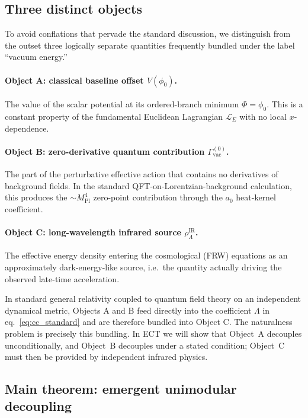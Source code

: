 \subsection{Three distinct objects}
\label{subsec:three_objects}

To avoid conflations that pervade the standard discussion, we
distinguish from the outset three logically separate quantities
frequently bundled under the label ``vacuum energy.''
\paragraph{Object A: classical baseline offset $V(\phi_0)$.}
The value of the scalar potential at its ordered-branch minimum
$\Phi = \phi_0$. This is a constant property of the fundamental
Euclidean Lagrangian $\mathcal{L}_E$ with no local $x$-dependence.

\paragraph{Object B: zero-derivative quantum contribution
$\Gamma_{\mathrm{vac}}^{(0)}$.} The part of the perturbative effective
action that contains no derivatives of background fields. In the
standard QFT-on-Lorentzian-background calculation, this produces the
$\sim M_{\mathrm{Pl}}^4$ zero-point contribution through the
$a_0$ heat-kernel coefficient.

\paragraph{Object C: long-wavelength infrared source
$\rho_\Lambda^{\mathrm{IR}}$.} The effective energy density entering
the cosmological (FRW) equations as an approximately dark-energy-like
source, i.e.\ the quantity actually driving the observed late-time
acceleration.

In standard general relativity coupled to quantum field theory on an
independent dynamical metric, Objects A and B feed directly into the
coefficient $\Lambda$ in eq.~\eqref{eq:cc_standard} and are therefore
bundled into Object C. The naturalness problem is precisely this
bundling. In ECT we will show that Object~A decouples unconditionally,
and Object~B decouples under a stated condition; Object~C must then be
provided by independent infrared physics.

\subsection{Main theorem: emergent unimodular decoupling}
\label{subsec:main_theorem}

